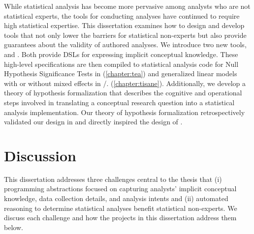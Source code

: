 
While statistical analysis has become more pervasive among analysts who are not
statistical experts, the tools for conducting analyses have continued to require
high statistical expertise. This dissertation examines how to design and develop
tools that not only lower the barriers for statistical non-experts but also
provide guarantees about the validity of authored analyses. We introduce two new
tools, \tea and \tisane. Both provide DSLs for expressing implicit conceptual
knowledge. These high-level specifications are then compiled to statistical
analysis code for Null Hypothesis Significance Tests in \tea (\autoref{chapter:tea}) and
generalized linear models with or without mixed effects in \tisane/\rTisane.
(\autoref{chapter:tisane}). 
Additionally, we develop a theory of hypothesis formalization that describes the
cognitive and operational steps involved in translating a conceptual research
question into a statistical analysis implementation. Our theory of hypothesis
formalization retrospectively validated our design in \tea and directly inspired
the design of \tisane. 


\section{Discussion} \label{sec:discussionChallenges} 

This dissertation addresses three challenges central to the thesis that (i)
programming abstractions focused on capturing analysts' implicit conceptual
knowledge, data collection details, and analysis intents and (ii) automated
reasoning to determine statistical analyses benefit statistical non-experts. We
discuss each challenge and how the projects in this dissertation address them
below. 

